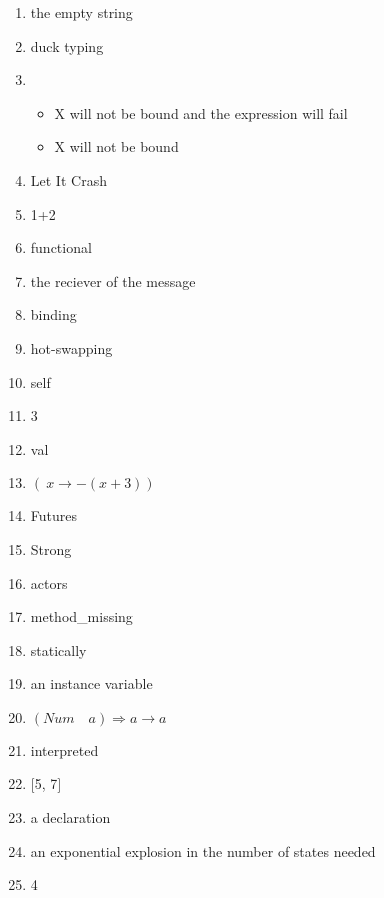 \documentclass{exam}
\begin{document}
\begin{enumerate}
\item the empty string
\item duck typing
\item \begin{itemize}
\item X will not be bound and the expression will fail
\item X will not be bound
\end{itemize}
\item Let It Crash
\item 1+2
\item functional
\item the reciever of the message
\item binding
\item hot-swapping
\item self
\item 3
\item val
\item $(\ x \rightarrow - (x + 3))$
\item Futures
\item Strong
\item actors
\item method\_missing
\item statically
\item an instance variable
\item $(Num \quad a) \Rightarrow a \rightarrow a$
\item interpreted
\item $\lbrack$5, 7$\rbrack$
\item a declaration
\item an exponential explosion in the number of states needed
\item 4
\end{enumerate}
\end{document}
